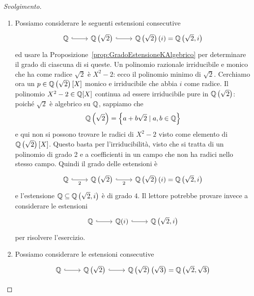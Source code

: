 \begin{proof}[Svolgimento]
\begin{enumerate}
\item Possiamo considerare le seguenti estensioni consecutive
\[\begin{tikzcd}
\Q \ar[r, hookrightarrow] & \Q\left(\sqrt 2\right) \ar[r, hookrightarrow] &  \Q\left(\sqrt 2\right)(i) = \Q\left(\sqrt 2, i\right)
\end{tikzcd}\]
ed usare la Proposizione~\ref{prop:GradoEstensioneKAlgebrico} per determinare il grado di ciascuna di si queste. Un polinomio razionale irriducibile e monico che ha come radice $\sqrt2$ è $X^2-2$: ecco il polinomio minimo di $\sqrt2$. Cerchiamo ora un $p \in \mathbb{Q}\left(\sqrt2\right) [X]$ monico e irriducibile che abbia $i$ come radice. Il polinomio $X^2-2 \in \mathbb{Q}[X]$ continua ad essere irriducibile pure in $\mathbb{Q}\left(\sqrt2\right)$: poiché $\sqrt 2$ è algebrico su $\mathbb{Q}$, sappiamo che
\[\mathbb{Q}\left(\sqrt2\right) = \left\{ a+b\sqrt2 \mid a, b \in \mathbb{Q} \right\}\]
e qui non si possono trovare le radici di $X^2-2$ visto come elemento di $\mathbb{Q}\left(\sqrt2\right)[X]$. Questo basta per l'irriducibilità, visto che si tratta di un polinomio di grado 2 e a coefficienti in un campo che non ha radici nello stesso campo. Quindi il grado delle estensioni è
\[\begin{tikzcd}
\Q \ar["2", r, hookrightarrow, swap] & \Q\left(\sqrt 2\right) \ar["2", r, hookrightarrow, swap] &  \Q\left(\sqrt 2\right)(i) = \Q\left(\sqrt 2, i\right)
\end{tikzcd}\]
e l'estensione $\mathbb{Q} \subseteq \mathbb{Q}\left(\sqrt 2, i\right)$ è di grado $4$.
Il lettore potrebbe provare invece a considerare le estensioni
\[\begin{tikzcd}
\Q \ar[r, hookrightarrow] & \Q(i) \ar[r, hookrightarrow] & \Q\left(\sqrt 2, i\right)
\end{tikzcd}\]
per risolvere l'esercizio.
\item Possiamo considerare le estensioni consecutive
\[\begin{tikzcd}
\Q \ar[r, hookrightarrow] & \Q\left(\sqrt 2\right) \ar[r, hookrightarrow] &  \Q\left(\sqrt 2\right)\left(\sqrt 3\right) = \Q\left(\sqrt 2, \sqrt 3\right)
\end{tikzcd} \]

\end{enumerate}
\end{proof}
